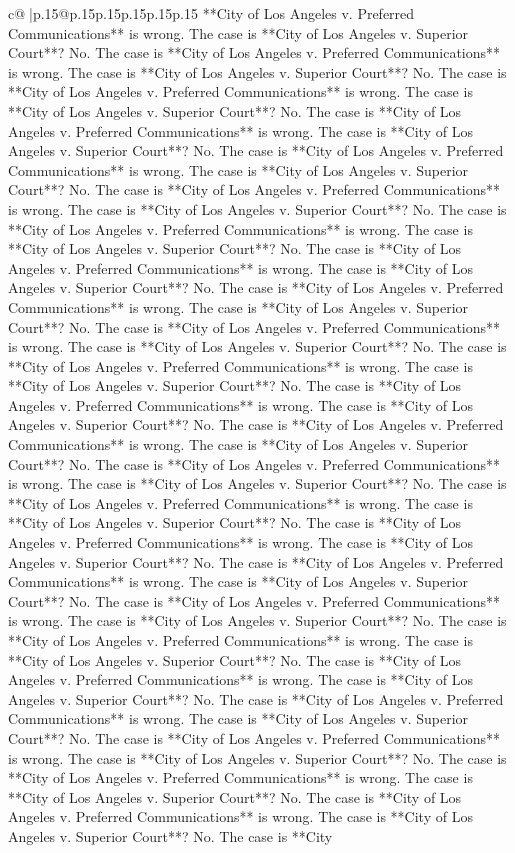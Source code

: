\documentclass{article}
\begin{document}
{\begin{supertabular}{c@{$\;$}|p{.15\linewidth}@{}p{.15\linewidth}p{.15\linewidth}p{.15\linewidth}p{.15\linewidth}p{.15\linewidth}}
{{{**City of Los Angeles v. Preferred Communications** is wrong. The case is **City of Los Angeles v. Superior Court**? No. The case is **City of Los Angeles v. Preferred Communications** is wrong. The case is **City of Los Angeles v. Superior Court**? No. The case is **City of Los Angeles v. Preferred Communications** is wrong. The case is **City of Los Angeles v. Superior Court**? No. The case is **City of Los Angeles v. Preferred Communications** is wrong. The case is **City of Los Angeles v. Superior Court**? No. The case is **City of Los Angeles v. Preferred Communications** is wrong. The case is **City of Los Angeles v. Superior Court**? No. The case is **City of Los Angeles v. Preferred Communications** is wrong. The case is **City of Los Angeles v. Superior Court**? No. The case is **City of Los Angeles v. Preferred Communications** is wrong. The case is **City of Los Angeles v. Superior Court**? No. The case is **City of Los Angeles v. Preferred Communications** is wrong. The case is **City of Los Angeles v. Superior Court**? No. The case is **City of Los Angeles v. Preferred Communications** is wrong. The case is **City of Los Angeles v. Superior Court**? No. The case is **City of Los Angeles v. Preferred Communications** is wrong. The case is **City of Los Angeles v. Superior Court**? No. The case is **City of Los Angeles v. Preferred Communications** is wrong. The case is **City of Los Angeles v. Superior Court**? No. The case is **City of Los Angeles v. Preferred Communications** is wrong. The case is **City of Los Angeles v. Superior Court**? No. The case is **City of Los Angeles v. Preferred Communications** is wrong. The case is **City of Los Angeles v. Superior Court**? No. The case is **City of Los Angeles v. Preferred Communications** is wrong. The case is **City of Los Angeles v. Superior Court**? No. The case is **City of Los Angeles v. Preferred Communications** is wrong. The case is **City of Los Angeles v. Superior Court**? No. The case is **City of Los Angeles v. Preferred Communications** is wrong. The case is **City of Los Angeles v. Superior Court**? No. The case is **City of Los Angeles v. Preferred Communications** is wrong. The case is **City of Los Angeles v. Superior Court**? No. The case is **City of Los Angeles v. Preferred Communications** is wrong. The case is **City of Los Angeles v. Superior Court**? No. The case is **City of Los Angeles v. Preferred Communications** is wrong. The case is **City of Los Angeles v. Superior Court**? No. The case is **City of Los Angeles v. Preferred Communications** is wrong. The case is **City of Los Angeles v. Superior Court**? No. The case is **City of Los Angeles v. Preferred Communications** is wrong. The case is **City of Los Angeles v. Superior Court**? No. The case is **City of Los Angeles v. Preferred Communications** is wrong. The case is **City of Los Angeles v. Superior Court**? No. The case is **City of Los Angeles v. Preferred Communications** is wrong. The case is **City of Los Angeles v. Superior Court**? No. The case is **City of Los Angeles v. Preferred Communications** is wrong. The case is **City of Los Angeles v. Superior Court**? No. The case is **City }}}
\end{supertabular}}
\end{document}
